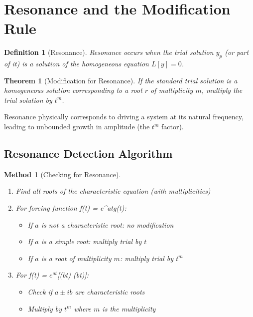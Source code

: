 \documentclass[12pt]{article}
\newtheorem{definition}{Definition}
\newtheorem{theorem}{Theorem}
\newtheorem{method}{Method}
\begin{document}
\section{Resonance and the Modification Rule}

\begin{definition}[Resonance]
Resonance occurs when the trial solution $y_p$ (or part of it) is a solution of the homogeneous equation $L[y] = 0$.
\end{definition}

\begin{theorem}[Modification for Resonance]
If the standard trial solution is a homogeneous solution corresponding to a root $r$ of multiplicity $m$, multiply the trial solution by $t^m$.
\end{theorem}

\begin{insight}
Resonance physically corresponds to driving a system at its natural frequency, leading to unbounded growth in amplitude (the $t^m$ factor).
\end{insight}

\subsection{Resonance Detection Algorithm}

\begin{method}[Checking for Resonance]
\begin{enumerate}
    \item Find all roots of the characteristic equation (with multiplicities)
    \item For forcing function f(t) = e^{at}g(t):
    \begin{itemize}
        \item If $a$ is not a characteristic root: no modification
        \item If $a$ is a simple root: multiply trial by $t$
        \item If $a$ is a root of multiplicity $m$: multiply trial by $t^m$
    \end{itemize}
    \item For f(t) = $e^{at}$[\sin(bt)  \cos(bt)]:
    \begin{itemize}
        \item Check if $a \pm ib$ are characteristic roots
        \item Multiply by $t^m$ where $m$ is the multiplicity
    \end{itemize}
\end{enumerate}
\end{method}
\end{document}
